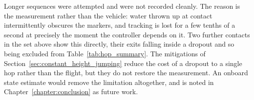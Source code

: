 Longer sequences were attempted and were not recorded cleanly.  The reason is
the measurement rather than the vehicle: water thrown up at contact
intermittently obscures the markers, and tracking is lost for a few tenths of
a second at precisely the moment the controller depends on it.  Two further
contacts in the set above show this directly, their exits falling inside a
dropout and so being excluded from Table~\ref{tab:hop_summary}.  The
mitigations of Section~\ref{sec:constant_height_jumping} reduce the cost of a
dropout to a single hop rather than the flight, but they do not restore the
measurement.  An onboard state estimate would remove the limitation
altogether, and is noted in Chapter~\ref{chapter:conclusion} as future
work.

